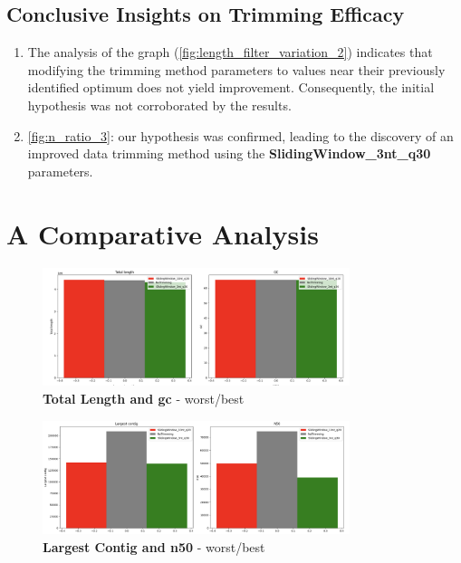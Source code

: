 \subsection{Conclusive Insights on Trimming Efficacy}

\begin{enumerate}
    \item The analysis of the graph (\autoref{fig:length_filter_variation_2}) indicates that modifying the \gls{trimming} method parameters to values near their previously identified optimum does not yield improvement. Consequently, the initial hypothesis was not corroborated by the results.
    \item \autoref{fig:n_ratio_3}: our hypothesis was confirmed, leading to the discovery of an improved data \gls{trimming} method using the \textbf{SlidingWindow\_3nt\_q30} parameters.
\end{enumerate}


\section{A Comparative Analysis}

\begin{figure}[!ht]
    \centering
    \includegraphics[width=0.8\textwidth]{resources/images/total_length_gc.png}
    \caption{\textbf{Total Length and \gls{gc}} - worst/best}
    \label{fig:total_length_gc}
\end{figure}

\begin{figure}[!ht]
    \centering
    \includegraphics[width=0.8\textwidth]{resources/images/largest_contig_n50.png}
    \caption{\textbf{Largest Contig and \gls{n50}} - worst/best}
    \label{fig:largest_contig_n50}
\end{figure}

